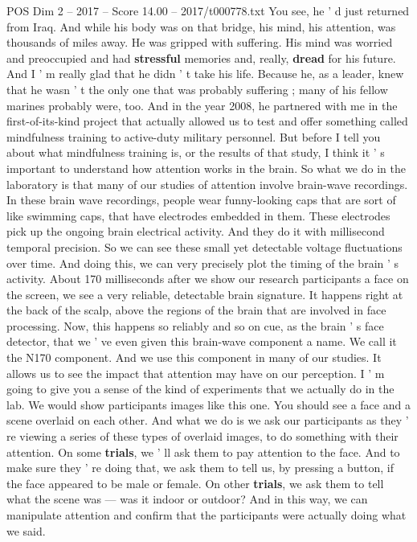 \begin{textsample}{POS Dim 2 – 2017 – Score 14.00 – 2017/t000778.txt}
You see, he ' d just returned from Iraq.
And while his body was on that bridge, his mind, his attention, was thousands of miles away.
He was gripped with suffering.
His mind was worried and preoccupied and had \textbf{stressful} memories and, really, \textbf{dread} for his future.
And I ' m really glad that he didn ' t take his life.
Because he, as a leader, knew that he wasn ' t the only one that was probably suffering ; many of his fellow marines probably were, too.
And in the year 2008, he partnered with me in the first-of-its-kind project that actually allowed us to test and offer something called mindfulness training to active-duty military personnel.
But before I tell you about what mindfulness training is, or the results of that study, I think it ' s important to understand how attention works in the brain.
So what we do in the laboratory is that many of our studies of attention involve brain-wave recordings.
In these brain wave recordings, people wear funny-looking caps that are sort of like swimming caps, that have electrodes embedded in them.
These electrodes pick up the ongoing brain electrical activity.
And they do it with millisecond temporal precision.
So we can see these small yet detectable voltage fluctuations over time.
And doing this, we can very precisely plot the timing of the brain ' s activity.
About 170 milliseconds after we show our research participants a face on the screen, we see a very reliable, detectable brain signature.
It happens right at the back of the scalp, above the regions of the brain that are involved in face processing.
Now, this happens so reliably and so on cue, as the brain ' s face detector, that we ' ve even given this brain-wave component a name.
We call it the N170 component.
And we use this component in many of our studies.
It allows us to see the impact that attention may have on our perception.
I ' m going to give you a sense of the kind of experiments that we actually do in the lab.
We would show participants images like this one.
You should see a face and a scene overlaid on each other.
And what we do is we ask our participants as they ' re viewing a series of these types of overlaid images, to do something with their attention.
On some \textbf{trials}, we ' ll ask them to pay attention to the face.
And to make sure they ' re doing that, we ask them to tell us, by pressing a button, if the face appeared to be male or female.
On other \textbf{trials}, we ask them to tell what the scene was — was it indoor or outdoor?
And in this way, we can manipulate attention and confirm that the participants were actually doing what we said.

\end{textsample}
